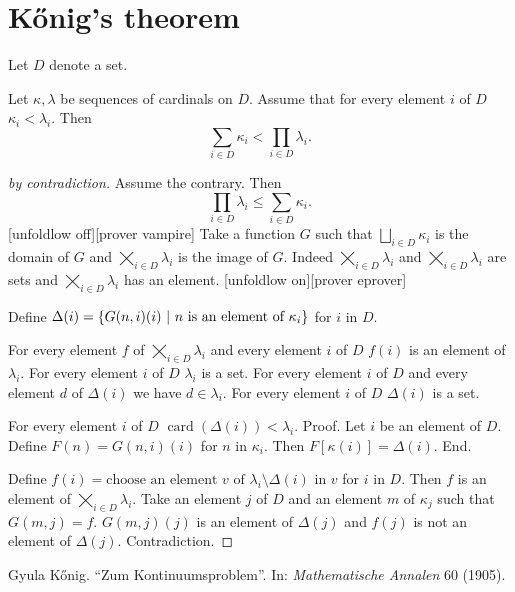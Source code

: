 \documentclass{article}
\newcommand{\card}[1]{\operatorname{card}(#1)}
\newcommand{\SumSet}[2]{\bigsqcup_{i \in #2} #1_{i}}
\newcommand{\Sum}[2]{\sum_{i \in #2} #1_{i}}
\newcommand{\ProdSet}[2]{\bigtimes_{i \in #2} #1_{i}}
\newcommand{\Prod}[2]{\prod_{i \in #2} #1_{i}}
\begin{document}
\section{Kőnig's theorem}

\begin{forthel}
  Let $D$ denote a set.

  \begin{theorem}
    Let $\kappa, \lambda$ be sequences of cardinals on $D$.
    Assume that for every element $i$ of $D$ $\kappa_{i} < \lambda_{i}$.
    Then \[ \Sum{\kappa}{D} < \Prod{\lambda}{D}. \]
  \end{theorem}
  \begin{proof}[by contradiction]
    Assume the contrary.
    Then \[ \Prod{\lambda}{D} \leq \Sum{\kappa}{D}. \]
    [unfoldlow off][prover vampire]
    Take a function $G$ such that $\SumSet{\kappa}{D}$ is the domain of $G$ and
    $\ProdSet{\lambda}{D}$ is the image of $G$.
    Indeed $\ProdSet{\lambda}{D}$ and $\ProdSet{\lambda}{D}$ are sets and
    $\ProdSet{\lambda}{D}$ has an element.
    [unfoldlow on][prover eprover]

    Define $\Delta(i) = \class{G(n,i)(i) | \text{$n$ is an element of
    $\kappa_{i}$}}$ for $i$ in $D$.

    For every element $f$ of $\ProdSet{\lambda}{D}$ and every element $i$ of $D$
    $f(i)$ is an element of $\lambda_{i}$.
    For every element $i$ of $D$ $\lambda_{i}$ is a set.
    For every element $i$ of $D$ and every element $d$ of $\Delta(i)$ we have
    $d\in \lambda_{i}$.
    For every element $i$ of $D$ $\Delta(i)$ is a set.

    For every element $i$ of $D$ $\card{\Delta(i)} < \lambda_{i}$. \newline
    Proof.
      Let $i$ be an element of $D$.
      Define $F(n) = G(n,i)(i)$ for $n$ in $\kappa_{i}$.
      Then $F[\kappa(i)] = \Delta(i)$.
    End.

    Define $f(i) = \text{choose an element $v$ of $\lambda_{i} \setminus
    \Delta(i)$ in $v$}$ for $i$ in $D$.
    Then $f$ is an element of $\ProdSet{\lambda}{D}$.
    Take an element $j$ of $D$ and an element $m$ of $\kappa_{j}$ such that
    $G(m,j) = f$.
    $G(m,j)(j)$ is an element of $\Delta(j)$ and $f(j)$ is not an element of
    $\Delta(j)$.
    Contradiction.
  \end{proof}
\end{forthel}

\begin{thebibliography}{9}
  Gyula Kőnig.
  ``Zum Kontinuumsproblem''.
  In: \textit{Mathematische Annalen} 60 (1905).
\end{thebibliography}
\end{document}
